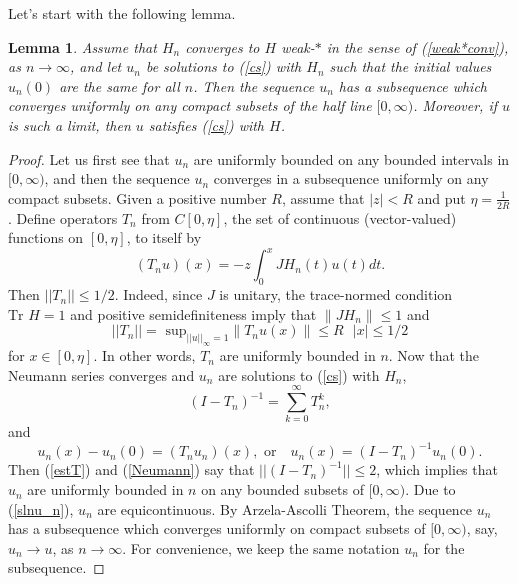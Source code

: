 \documentclass[preprint,12pt]{elsarticle}
\newtheorem{Lemma}[Theorem]{Lemma}
\begin{document}
Let's start with the following lemma. 
\begin{Lemma}
\label{convergenceforH}
Assume that $H_n$ converges to $H$ weak-$*$ in the sense of (\ref{weak*conv}), as $n\to\infty$, and let $u_n$ be solutions to (\ref{cs}) with $H_n$ such that the initial values $u_n(0)$ are the same for all $n$. Then the sequence $u_n$ has a subsequence which converges uniformly on any compact subsets of the half line $[0,\infty)$. Moreover, if $u$ is such a limit, then $u$ satisfies (\ref{cs}) with $H$. 
\end{Lemma}
\begin{proof}
Let us first see that $u_n$ are uniformly bounded on any bounded intervals in $[0,\infty)$, and then the sequence $u_n$ converges in a subsequence uniformly on any compact subsets. Given a positive number $R$,  assume that $|z|<R$ and put $\eta=\frac1{2R}$. Define operators $T_n$ from $C[0,\eta]$, the set of continuous (vector-valued) functions on $[0,\eta]$, to itself by
\begin{equation*}
(T_nu)(x)=-z\int_0^xJH_n(t)u(t)dt.
\end{equation*}
Then $||T_n||\leq 1/2$. Indeed, since $J$ is unitary, the trace-normed condition $\textrm{Tr }H=1$ and positive semidefiniteness imply that $\| JH_n \| \leq 1$ and  
\begin{equation}
\label{estT}
||T_n||
 = \textrm{ sup}_{||u||_{\infty}=1} \| T_nu(x) \| \leq  R\textrm{ }|x| \leq 1/2  
\end{equation}
for $x\in[0,\eta]$. 
In other words, $T_n$ are uniformly bounded in $n$. Now that the Neumann series converges and $u_n$ are solutions to (\ref{cs}) with $H_n$,  
\begin{equation}
\label{Neumann}
(I-T_n)^{-1}=\sum_{k=0}^{\infty}T_n^k,
\end{equation}
and 
\begin{equation}
\label{slnu_n}
u_n(x)-u_n(0)=(T_nu_n)(x), \textrm{ or} \quad u_n(x)=(I-T_n)^{-1}u_n(0). 
\end{equation}
Then (\ref{estT}) and (\ref{Neumann}) say that $|| (I-T_n)^{-1} ||\leq 2$, which implies that $u_n$ are uniformly bounded in $n$ on any bounded subsets of $[0,\infty)$. Due to (\ref{slnu_n}), $u_n$ are equicontinuous. By Arzela-Ascolli Theorem, the sequence $u_n$ has a subsequence which converges uniformly on compact subsets of $[0,\infty)$, say, $u_n\to u$, as $n\to\infty$. For convenience, we keep the same notation $u_n$ for the subsequence.


\end{proof}
\end{document}
